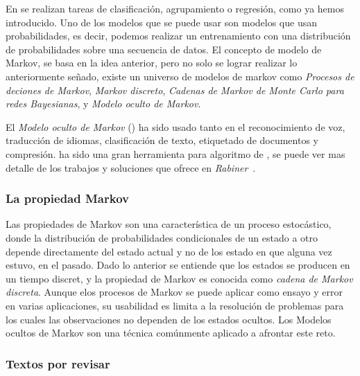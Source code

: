 En \machinelearning se realizan tareas de clasificación, agrupamiento o regresión, como ya hemos introducido. Uno de los modelos que se puede usar son modelos que usan probabilidades, es decir, podemos realizar un entrenamiento con una distribución de probabilidades sobre una secuencia de datos. El concepto de modelo de Markov, se basa en la idea anterior, pero no solo se lograr realizar lo anteriormente señado, existe un universo de modelos de markov como \emph{Procesos de deciones de Markov}, \emph{Markov discreto}, \emph{Cadenas de Markov de Monte Carlo para redes Bayesianas}, y  \emph{Modelo oculto de Markov}.

El \emph{Modelo oculto de Markov} (\HMM) ha sido usado tanto en el reconocimiento de voz, traducción de idiomas, clasificación de texto, etiquetado de documentos y compresión. \HMM ha sido una gran herramienta para algoritmo de \machinelearning, se puede ver mas detalle de los trabajos y soluciones que ofrece en \emph{Rabiner}~\cite{}.





\subsubsection{La propiedad Markov}



Las propiedades de Markov son una característica de un proceso estocástico, donde la distribución de probabilidades condicionales de un estado a otro depende directamente del estado actual y no de los estado en que alguna vez estuvo, en el pasado. Dado lo anterior se entiende que los estados se producen en un tiempo discret, y la propiedad de Markov es conocida como \emph{cadena de Markov discreta}. Aunque elos procesos de Markov se puede aplicar como ensayo y error en varias aplicaciones, su usabilidad es limita a la resolución de problemas para los cuales las observaciones no dependen de los estados ocultos. Los Modelos ocultos de Markov son una técnica comúnmente aplicado a afrontar este reto.






\subsubsection{Textos por revisar}



